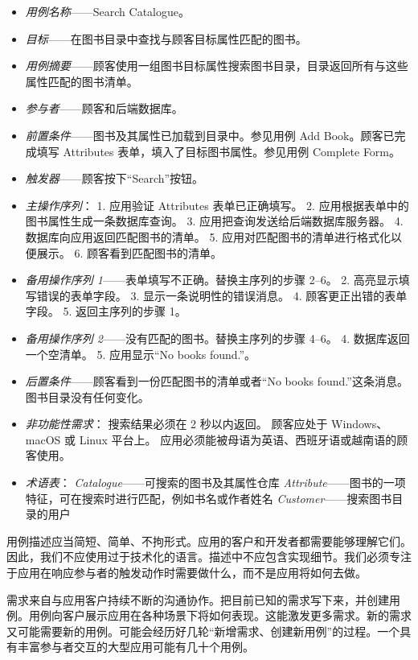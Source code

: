 \begin{itemize}
\item \emph{用例名称}——Search Catalogue。
\item \emph{目标}——在图书目录中查找与顾客目标属性匹配的图书。
\item \emph{用例摘要}——顾客使用一组图书目标属性搜索图书目录，目录返回所有与这些属性匹配的图书清单。
\item \emph{参与者}——顾客和后端数据库。
\item \emph{前置条件}——图书及其属性已加载到目录中。参见用例 Add Book。顾客已完成填写 Attributes 表单，填入了目标图书属性。参见用例 Complete Form。
\item \emph{触发器}——顾客按下“Search”按钮。
\item \emph{主操作序列}： 1. 应用验证 Attributes 表单已正确填写。 2. 应用根据表单中的图书属性生成一条数据库查询。 3. 应用把查询发送给后端数据库服务器。 4. 数据库向应用返回匹配图书的清单。 5. 应用对匹配图书的清单进行格式化以便展示。 6. 顾客看到匹配图书的清单。
\item \emph{备用操作序列 1}——表单填写不正确。替换主序列的步骤 2–6。 2. 高亮显示填写错误的表单字段。 3. 显示一条说明性的错误消息。 4. 顾客更正出错的表单字段。 5. 返回主序列的步骤 1。
\item \emph{备用操作序列 2}——没有匹配的图书。替换主序列的步骤 4–6。 4. 数据库返回一个空清单。 5. 应用显示“No books found.”。
\item \emph{后置条件}——顾客看到一份匹配图书的清单或者“No books found.”这条消息。图书目录没有任何变化。
\item \emph{非功能性需求}： 搜索结果必须在 2 秒以内返回。 顾客应处于 Windows、macOS 或 Linux 平台上。 应用必须能被母语为英语、西班牙语或越南语的顾客使用。
\item \emph{术语表}： \emph{Catalogue}——可搜索的图书及其属性仓库 \emph{Attribute}——图书的一项特征，可在搜索时进行匹配，例如书名或作者姓名 \emph{Customer}——搜索图书目录的用户
\end{itemize}

用例描述应当简短、简单、不拘形式。应用的客户和开发者都需要能够理解它们。因此，我们不应使用过于技术化的语言。描述中不应包含实现细节。我们必须专注于应用在响应参与者的触发动作时需要做什么，而不是应用将如何去做。

需求来自与应用客户持续不断的沟通协作。把目前已知的需求写下来，并创建用例。用例向客户展示应用在各种场景下将如何表现。这能激发更多需求。新的需求又可能需要新的用例。可能会经历好几轮“新增需求、创建新用例”的过程。一个具有丰富参与者交互的大型应用可能有几十个用例。

